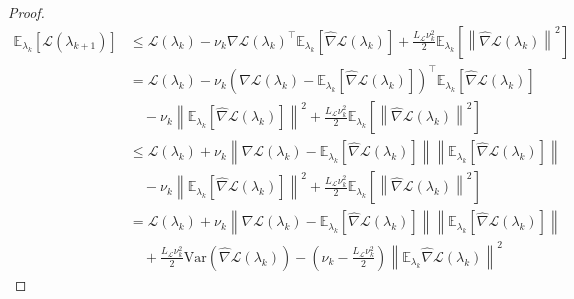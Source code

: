 \documentclass[11pt, twoside]{report}
\begin{document}
\begin{proof}
\begin{align*}
\mathbb{E}_{\lambda_k}\left[\mathcal{L}(\lambda_{k+1})\right] &\leq \mathcal{L}(\lambda_k) -\nu_k \nabla \mathcal{L}(\lambda_k)^\top \mathbb{E}_{\lambda_k}\left[\widehat{\nabla}\mathcal{L}(\lambda_k)\right] + \frac{L_{\mathcal{L}}\nu_k^2 }{2}\mathbb{E}_{\lambda_k}\left[\left\|\widehat{\nabla}\mathcal{L}(\lambda_k)\right\|^2\right] \\
&= \mathcal{L}(\lambda_k) 
- \nu_k \left( \nabla \mathcal{L}(\lambda_k) 
    - \mathbb{E}_{\lambda_k}\left[ \widehat{\nabla} \mathcal{L}(\lambda_k) \right] \right)^\top 
    \mathbb{E}_{\lambda_k}\left[ \widehat{\nabla} \mathcal{L}(\lambda_k) \right] \\
&\quad 
- \nu_k \left\| \mathbb{E}_{\lambda_k} \left[ \widehat{\nabla} \mathcal{L}(\lambda_k) \right] \right\|^2 
+ \frac{L_{\mathcal{L}} \nu_k^2}{2} 
    \mathbb{E}_{\lambda_k} \left[ \left\| \widehat{\nabla} \mathcal{L}(\lambda_k) \right\|^2 \right] \\
&\leq \mathcal{L}(\lambda_k) 
+ \nu_k \left\| \nabla \mathcal{L}(\lambda_k) 
    - \mathbb{E}_{\lambda_k} \left[ \widehat{\nabla} \mathcal{L}(\lambda_k) \right] \right\| 
    \left\| \mathbb{E}_{\lambda_k} \left[ \widehat{\nabla} \mathcal{L}(\lambda_k) \right] \right\| \\
&\quad 
- \nu_k \left\| \mathbb{E}_{\lambda_k} \left[ \widehat{\nabla} \mathcal{L}(\lambda_k) \right] \right\|^2 
+ \frac{L_{\mathcal{L}} \nu_k^2}{2} 
  \mathbb{E}_{\lambda_k} \left[ \left\| \widehat{\nabla} \mathcal{L}(\lambda_k) \right\|^2 \right]\\
  &= \mathcal{L}(\lambda_k) 
+ \nu_k \left\| \nabla \mathcal{L}(\lambda_k) 
  - \mathbb{E}_{\lambda_k} \left[ \widehat{\nabla} \mathcal{L}(\lambda_k) \right] \right\| 
  \left\| \mathbb{E}_{\lambda_k} \left[ \widehat{\nabla} \mathcal{L}(\lambda_k) \right] \right\| \\
&\quad 
+ \frac{L_{\mathcal{L}} \nu_k^2}{2} 
  \mathrm{Var} \left( \widehat{\nabla} \mathcal{L}(\lambda_k) \right) 
- \left( \nu_k 
  - \frac{L_{\mathcal{L}} \nu_k^2}{2} \right) 
  \left\| \mathbb{E}_{\lambda_k} \widehat{\nabla} \mathcal{L}(\lambda_k) \right\|^2
\end{align*}

\end{proof}
\end{document}
